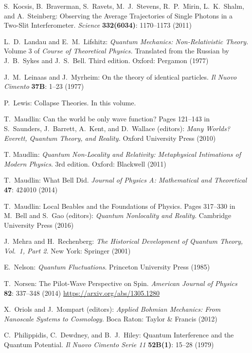 \documentclass[12pt]{article}
\begin{document}
\begin{thebibliography}{20}
 S.~Kocsis,  B.~Braverman, S.~Ravets, 
	M.~J.~Stevens, R.~P.~Mirin, L.~K.~Shalm, and A.~Steinberg: 
	Observing the Average Trajectories of Single Photons in 
	a Two-Slit Interferometer.
	{\it Science} {\bf 332(6034)}: 1170--1173 (2011)

 L.~D.~Landau and E.~M.~Lifshitz:
	{\it Quantum Mechanics: Non-Relativistic Theory.}
	Volume 3 of {\it Course of Theoretical Physics.}
	Translated from the Russian by J.~B.~Sykes and J.~S.~Bell. 
	Third edition.
	Oxford: Pergamon (1977)

 J.~M.~Leinaas and J.~Myrheim: 
	On the theory of identical particles. 
	{\em Il Nuovo Cimento} {\bf 37B}: 1--23 (1977)

 P.~Lewis: Collapse Theories.
	In this volume.
	
 T.~Maudlin:
	Can the world be only wave function?
	Pages 121--143 in S.~Saunders, J.~Barrett, A.~Kent, 
	and D.~Wallace (editors):
	{\it Many Worlds? Everett, Quantum Theory, and Reality.}
	Oxford University Press (2010)

 T. Maudlin:
	\textit{Quantum Non-Locality and Relativity: Metaphysical 
	Intimations of Modern Physics}. 
	3rd edition. Oxford: Blackwell (2011)

 T.~Maudlin: 
	What Bell Did.
	\textit{Journal of Physics A: Mathematical and Theoretical} 
	\textbf{47}: 424010 (2014)

 T.~Maudlin:
	Local Beables and the Foundations of Physics.
	Pages 317--330 in M.~Bell and S.~Gao (editors): 
	{\it Quantum Nonlocality and Reality}.
	Cambridge University Press (2016)

 J.~Mehra and H.~Rechenberg: 
	 \textit{The Historical Development of Quantum Theory, 
	 Vol.~1, Part 2.} 
	 New York: Springer (2001)

 E.~Nelson: 
	{\it Quantum Fluctuations}.
	Princeton University Press (1985)

 T.~Norsen:
	The Pilot-Wave Perspective on Spin.
	{\it American Journal of Physics} {\bf 82}: 337--348 (2014)
	\url{https://arxiv.org/abs/1305.1280}

 X.~Oriols and J.~Mompart (editors):
	{\it Applied Bohmian Mechanics: From Nanoscale Systems 
	to Cosmology.}
	Boca Raton: Taylor \& Francis (2012)

 C.~Philippidis, C.~Dewdney, 
	and B.~J.~Hiley:
	Quantum Interference and the Quantum Potential.
	{\it Il Nuovo Cimento Serie 11} {\bf 52B(1)}: 15--28 (1979)


\end{thebibliography}
\end{document}
